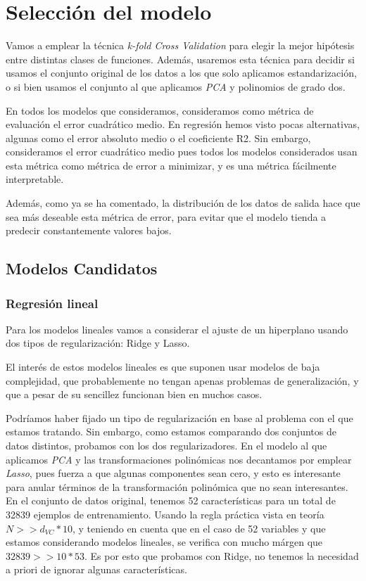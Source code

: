\documentclass[11pt]{article}
\begin{document}
\pagebreak

\section{Selección del modelo} \label{seleccion_modelos} \label{metrica_error}

Vamos a emplear la técnica \emph{k-fold Cross Validation} para elegir la mejor hipótesis entre distintas clases de funciones. Además, usaremos esta técnica para decidir si usamos el conjunto original de los datos a los que solo aplicamos estandarización, o si bien usamos el conjunto al que aplicamos \emph{PCA} y polinomios de grado dos.

En todos los modelos que consideramos, consideramos como métrica de evaluación el error cuadrático medio. En regresión hemos visto pocas alternativas, algunas como el error absoluto medio o el coeficiente R2. Sin embargo, consideramos el error cuadrático medio pues todos los modelos considerados usan esta métrica como métrica de error a minimizar, y es una métrica fácilmente interpretable.

Además, como ya se ha comentado, la distribución de los datos de salida hace que sea más deseable esta métrica de error, para evitar que el modelo tienda a predecir constantemente valores bajos. 

\subsection{Modelos Candidatos}

\subsubsection{Regresión lineal} \label{regresion_lineal}

Para los modelos lineales vamos a considerar el ajuste de un hiperplano usando dos tipos de regularización: Ridge y Lasso.

El interés de estos modelos lineales es que suponen usar modelos de baja complejidad, que probablemente no tengan apenas problemas de generalización, y que a pesar de su sencillez funcionan bien en muchos casos.

Podríamos haber fijado un tipo de regularización en base al problema con el que estamos tratando. Sin embargo, como estamos comparando dos conjuntos de datos distintos, probamos con los dos regularizadores. En el modelo al que aplicamos \emph{PCA} y las transformaciones polinómicas nos decantamos por emplear \emph{Lasso}, pues fuerza a que algunas componentes sean cero, y esto es interesante para anular términos de la transformación polinómica que no sean interesantes. En el conjunto de datos original, tenemos 52 características para un total de 32839 ejemplos de entrenamiento. Usando la regla práctica vista en teoría $N >> d_{VC} * 10$, y teniendo en cuenta que en el caso de 52 variables y que estamos considerando modelos lineales, se verifica con mucho márgen que $32839 >> 10 * 53$. Es por esto que probamos con Ridge, no tenemos la necesidad a priori de ignorar algunas características.
\end{document}
